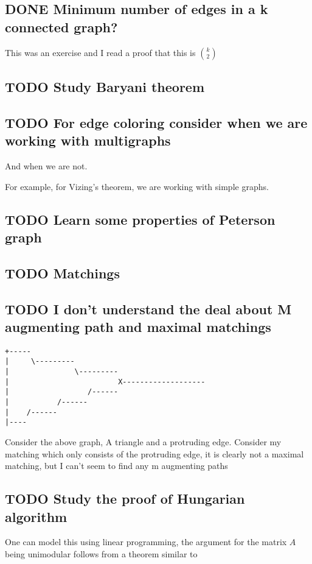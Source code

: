 \documentclass[11pt]{article}
\begin{document}
\subsection{{\bfseries\sffamily DONE} Minimum number of edges in a k connected graph?}
\label{sec:orgb434a82}
This was an exercise and I read a proof that this is \(\binom{k}{2}\)
\subsection{{\bfseries\sffamily TODO} Study Baryani theorem}
\label{sec:orga823e7f}
\subsection{{\bfseries\sffamily TODO} For edge coloring consider when we are working with multigraphs}
\label{sec:orgcda3ae2}
And when we are not.

For example, for Vizing's theorem, we are working with simple graphs.
\subsection{{\bfseries\sffamily TODO} Learn some properties of Peterson graph}
\label{sec:org069cdc2}
\subsection{{\bfseries\sffamily TODO} Matchings}
\label{sec:org47537d5}
\subsection{{\bfseries\sffamily TODO} I don't understand the deal about M augmenting path and maximal matchings}
\label{sec:orgb94bb92}

\begin{verbatim}
+-----
|     \---------
|               \---------
|                         X-------------------
|                  /------
|           /------
|    /------
|----
\end{verbatim}

Consider the above graph, A triangle and a protruding edge. Consider my
matching which only consists of the protruding edge, it is clearly not a
maximal matching, but I can't seem to find any m augmenting paths
\subsection{{\bfseries\sffamily TODO} Study the proof of Hungarian algorithm}
\label{sec:org2bf4a9d}
One can model this using linear programming, the argument for the matrix \(A\)
being unimodular follows from a theorem similar to
\end{document}
